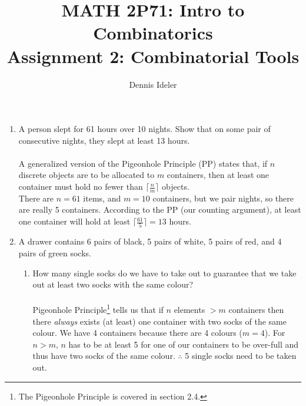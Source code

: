 \documentclass[10pt,a4paper,final]{article}
\author{Dennis Ideler}
\title{MATH 2P71: Intro to Combinatorics\\Assignment 2: Combinatorial Tools}
\begin{document}
\maketitle

\begin{enumerate}
\item %
A person slept for 61 hours over 10 nights.
Show that on some pair of consecutive nights, they slept at least 13 hours.\\
\\
A generalized version of the Pigeonhole Principle (PP) states that,
if $n$ discrete objects are to be allocated to $m$ containers,
then at least one container must hold no fewer than $\lceil \frac{n}{m} \rceil$ objects.\\
There are $n = 61$ items, and $m = 10$ containers, but we pair nights, so there are really
5 containers. According to the PP (our counting argument), at least one container will hold
at least $\lceil \frac{61}{5} \rceil = 13$ hours.

\item %
A drawer contains 6 pairs of black, 5 pairs of white, 5 pairs of red, and 4 pairs of green socks.
  \begin{enumerate}
  \item %
  How many single socks do we have to take out to guarantee that we take out at least two socks
  with the same colour?\\
  \\
  Pigeonhole Principle\footnote{The Pigeonhole Principle is covered in section 2.4.}
  tells us that if $n$ elements $> m$ containers
  then there \emph{always} exists (at least) one container with two socks of the same colour.
  We have 4 containers because there are 4 colours ($m = 4$).
  For $n > m$, $n$ has to be at least 5 for one of our containers to be over-full
  and thus have two socks of the same colour. $\therefore$ 5 single socks need to be taken out.
  

\end{enumerate}
\end{enumerate}
\end{document}
